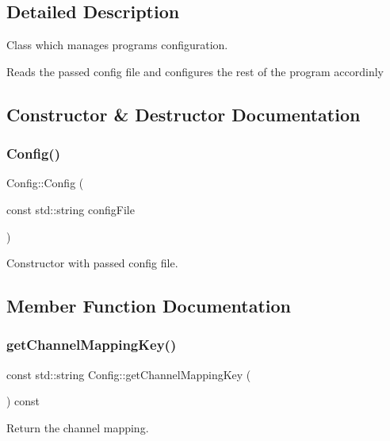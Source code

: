 \subsection{Detailed Description}
Class which manages programs configuration. 

Reads the passed config file and configures the rest of the program accordinly 

\subsection{Constructor \& Destructor Documentation}
\mbox{\label{class_config_af8b0e9dc72b16b73ebb32d177fb93e1b}} 
\subsubsection{\texorpdfstring{Config()}{Config()}}
{\footnotesize\ttfamily Config\+::\+Config (\begin{DoxyParamCaption}\item[{const std\+::string}]{config\+File }\end{DoxyParamCaption})}



Constructor with passed config file. 



\subsection{Member Function Documentation}
\mbox{\label{class_config_af674521a99614ecbd0cb8885b257663b}} 
\subsubsection{\texorpdfstring{get\+Channel\+Mapping\+Key()}{getChannelMappingKey()}}
{\footnotesize\ttfamily const std\+::string Config\+::get\+Channel\+Mapping\+Key (\begin{DoxyParamCaption}{ }\end{DoxyParamCaption}) const\hspace{0.3cm}{\ttfamily [inline]}}



Return the channel mapping. 


